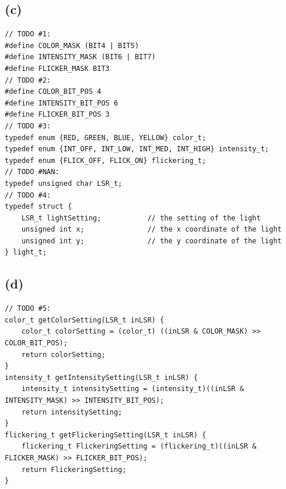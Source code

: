 \documentclass{article}
\begin{document}
\subsection*{(c)}
\begin{center}
        \lstset{language=C}
        \lstset{frame=lines}
        \lstset{basicstyle=\footnotesize}
        \begin{lstlisting}
// TODO #1: 
#define COLOR_MASK (BIT4 | BIT5)
#define INTENSITY_MASK (BIT6 | BIT7)
#define FLICKER_MASK BIT3
// TODO #2:
#define COLOR_BIT_POS 4
#define INTENSITY_BIT_POS 6
#define FLICKER_BIT_POS 3
// TODO #3: 
typedef enum {RED, GREEN, BLUE, YELLOW} color_t;
typedef enum {INT_OFF, INT_LOW, INT_MED, INT_HIGH} intensity_t;
typedef enum {FLICK_OFF, FLICK_ON} flickering_t;
// TODO #NAN: 
typedef unsigned char LSR_t;
// TODO #4:
typedef struct {
    LSR_t lightSetting;           // the setting of the light
    unsigned int x;               // the x coordinate of the light
    unsigned int y;               // the y coordinate of the light
} light_t;
        \end{lstlisting}
\end{center}
\newpage
\subsection*{(d)}
\begin{center}
        \lstset{language=C}
        \lstset{frame=lines}
        \lstset{basicstyle=\footnotesize}
        \begin{lstlisting}
// TODO #5:
color_t getColorSetting(LSR_t inLSR) {
    color_t colorSetting = (color_t) ((inLSR & COLOR_MASK) >> COLOR_BIT_POS);
    return colorSetting;
}
intensity_t getIntensitySetting(LSR_t inLSR) {
    intensity_t intensitySetting = (intensity_t)((inLSR & INTENSITY_MASK) >> INTENSITY_BIT_POS);
    return intensitySetting;
}
flickering_t getFlickeringSetting(LSR_t inLSR) {
    flickering_t FlickeringSetting = (flickering_t)((inLSR & FLICKER_MASK) >> FLICKER_BIT_POS);
    return FlickeringSetting;
}
        \end{lstlisting}
\end{center}
\end{document}
